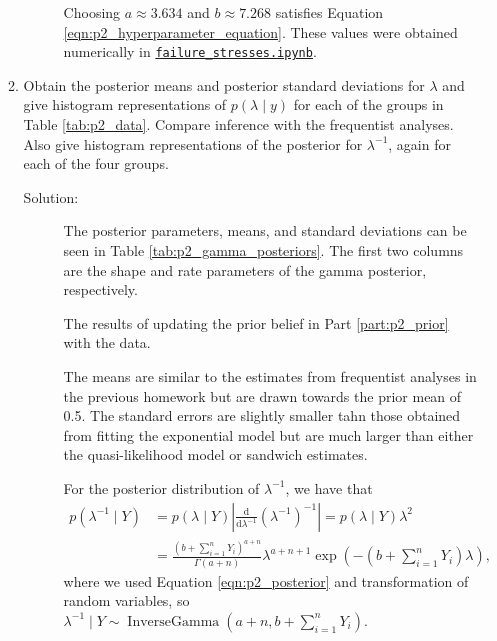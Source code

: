 \documentclass[letterpaper,11pt]{article}
\begin{document}
\begin{enumerate}
\begin{enumerate}
\begin{description}
        Choosing $a \approx 3.634$ and $b \approx 7.268$ satisfies Equation
        \ref{eqn:p2_hyperparameter_equation}. These values were obtained
        numerically in
        \href{https://nbviewer.jupyter.org/github/ppham27/stat570/blob/master/hw4/failure\_stresses.ipynb}{\texttt{failure\_stresses.ipynb}}.
      \end{description}
    \item Obtain the posterior means and posterior standard deviations for
      $\lambda$ and give histogram representations of
      $p\left(\lambda\mid y\right)$ for each of the groups in Table
      \ref{tab:p2_data}. Compare inference with the frequentist analyses.  Also
      give histogram representations of the posterior for $\lambda^{-1}$, again
      for each of the four groups.
      \begin{description}
      \item[Solution:] The posterior parameters, means, and standard deviations
        can be seen in Table \ref{tab:p2_gamma_posteriors}. The first two
        columns are the shape and rate parameters of the gamma posterior,
        respectively.        

        \begin{table}
          \centering
          
          \caption{The results of updating the prior belief in Part
            \ref{part:p2_prior} with the data.}
          \label{tab:p2_gamma_posteriors}
        \end{table}

        The means are similar to the estimates from frequentist analyses in the
        previous homework but are drawn towards the prior mean of 0.5. The
        standard errors are slightly smaller tahn those obtained from fitting
        the exponential model but are much larger than either the
        quasi-likelihood model or sandwich estimates.

        For the posterior distribution of $\lambda^{-1}$, we have that
        \begin{align}
          p\left(\lambda^{-1} \mid Y\right)
          &= p\left(\lambda \mid Y\right)\left\lvert
            \frac{\mathrm{d}}{\mathrm{d}\lambda^{-1}}\left(\lambda^{-1}\right)^{-1}
          \right\rvert = p\left(\lambda \mid Y\right)\lambda^{2} \nonumber\\
          &= \frac{\left(b + \sum_{i=1}^nY_i\right)^{a+n}}{\Gamma\left(a + n\right)}
          \lambda^{a + n + 1}\exp\left(-\left(b + \sum_{i=1}^nY_i\right)\lambda\right),
          \label{eqn:p2_posterior_inverse}
        \end{align}
        where we used Equation \ref{eqn:p2_posterior} and transformation of
        random variables, so
        $\lambda^{-1} \mid Y \sim \operatorname{InverseGamma}\left(
          a + n,
          b + \sum_{i=1}^nY_i
        \right)$.


\end{description}
\end{enumerate}
\end{enumerate}
\end{document}
